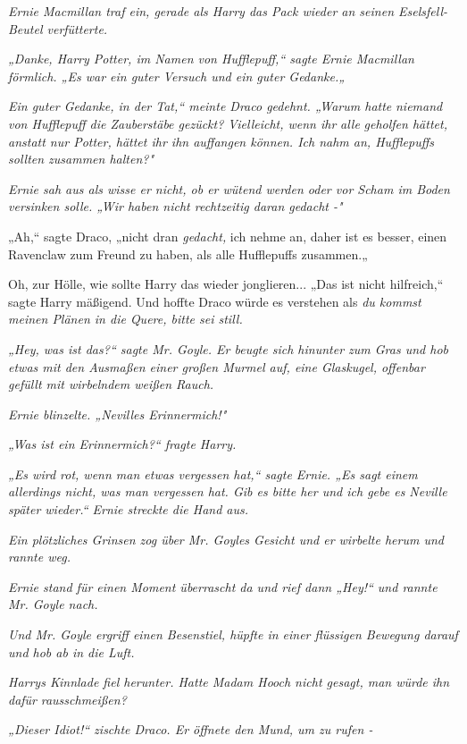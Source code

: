 {\emph{Ernie Macmillan traf ein, gerade als Harry das Pack wieder an seinen Eselsfell-Beutel verfütterte.}

\emph{„Danke, Harry Potter, im Namen von Hufflepuff,“ sagte Ernie Macmillan förmlich. „Es war ein guter Versuch und ein guter Gedanke.„}

\emph{Ein guter Gedanke, in der Tat,“ meinte Draco gedehnt. „Warum hatte} \emph{niemand von Hufflepuff die Zauberstäbe gezückt? Vielleicht, wenn ihr} \emph{\emph{alle}} \emph{geholfen hättet, anstatt nur Potter, hättet ihr ihn auffangen können. Ich nahm an, Hufflepuffs sollten zusammen halten?"}

\emph{Ernie sah aus als wisse er nicht, ob er wütend werden oder vor Scham im Boden versinken solle. „Wir haben nicht rechtzeitig daran gedacht -"}

„Ah,“ sagte Draco, „nicht dran \emph{gedacht,} ich nehme an, daher ist es besser, einen Ravenclaw zum Freund zu haben, als alle Hufflepuffs zusammen.„

Oh, zur Hölle, wie sollte Harry das wieder jonglieren... „Das ist nicht hilfreich,“ sagte Harry mäßigend. Und hoffte Draco würde es verstehen als \emph{du kommst meinen Plänen in die Quere, bitte sei still.}

\emph{„Hey, was ist das?“ sagte Mr. Goyle. Er beugte sich hinunter zum Gras und hob etwas mit den Ausmaßen einer großen Murmel auf, eine Glaskugel, offenbar gefüllt mit wirbelndem weißen Rauch.}

\emph{Ernie blinzelte. „Nevilles Erinnermich!"}

\emph{„Was ist ein Erinnermich?“ fragte Harry.}

\emph{„Es wird rot, wenn man etwas vergessen hat,“ sagte Ernie. „Es sagt einem allerdings nicht, was man vergessen hat. Gib es bitte her und ich gebe es Neville später wieder.“ Ernie streckte die Hand aus.}

\emph{Ein plötzliches Grinsen zog über Mr. Goyles Gesicht und er wirbelte herum und rannte weg.}

\emph{Ernie stand für einen Moment überrascht da und rief dann „Hey!“ und rannte Mr. Goyle nach.}

\emph{Und Mr. Goyle ergriff einen Besenstiel, hüpfte in einer flüssigen Bewegung darauf und hob ab in die Luft.}

\emph{Harrys Kinnlade fiel herunter. Hatte Madam Hooch nicht gesagt, man würde ihn dafür} \emph{\emph{rausschmeißen?}}

\emph{„\emph{Dieser Idiot!}“ zischte Draco. Er öffnete den Mund, um zu rufen -}

}
